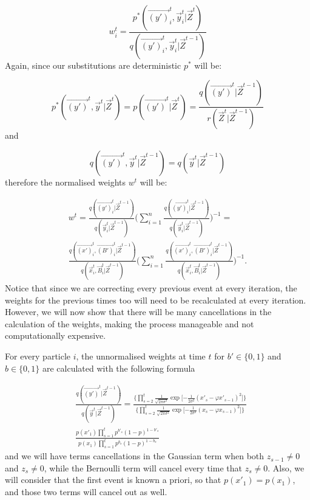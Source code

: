 \begin{equation*}
    w^{t}_i = \frac{p^*(\vec{(y')}^{t}_i, \vec{y}^{t}_i | \vec{Z}^{t})} {q(\vec{(y')}^{t}_i, \vec{y}^{t}_i|\vec{Z}^{t-1})}
\end{equation*}
Again, since our substitutions are deterministic $p^*$ will be:

\begin{equation*}
    p^*(\vec{(y')}^{t}, \vec{y}^{t} | \vec{Z}^{t}) = p(\vec{(y')}^{t} | \vec{Z}^{t}) = \frac{ q(\vec{(y')}^{t}|\vec{Z}^{t-1})} {r(\vec{Z}^{t} | \vec{Z}^{t-1})}
\end{equation*}
and

\begin{equation*}
    q(\vec{(y')}^{t}, \vec{y}^{t} | \vec{Z}^{t-1}) = q(\vec{y}^{t} | \vec{Z}^{t-1})
\end{equation*}
therefore the normalised weights $w^t$ will be:

\begin{multline*}
    w^{t} = \frac{q(\vec{(y')}^{t}_i | \vec{Z}^{t-1}) }{q(\vec{y}^{t}_i | \vec{Z}^{t-1})}\Bigg( \sum_{i=1}^n  \frac{q(\vec{(y')}^{t}_i | \vec{Z}^{t-1}) }{q(\vec{y}^{t}_i | \vec{Z}^{t-1})}\Bigg)^{-1} = \\
    \frac{q(\vec{(x')}^{t}_i, \vec{(B')}^{t}_i | \vec{Z}^{t-1}) }{q(\vec{x}^{t}_i, \vec{B}^{t}_i | \vec{Z}^{t-1})}\Bigg( \sum_{i=1}^n \frac{q(\vec{(x')}^{t}_i, \vec{(B')}^{t}_i | \vec{Z}^{t-1}) }{q(\vec{x}^{t}_i, \vec{B}^{t}_i | \vec{Z}^{t-1})}\Bigg)^{-1}.
\end{multline*}
Notice that since we are correcting every previous event at every iteration, the weights for the previous times too will need to be recalculated at every iteration. However, we will now show that there will be many cancellations in the calculation of the weights, making the process manageable and not computationally expensive.

For every particle $i$, the unnormalised weights at time $t$ for $b' \in \{0,1\}$ and $b \in \{0,1\}$ are calculated with the following formula

\begin{align} \label{eq:2}
    &\frac{q(\vec{(y')}^{t} | \vec{Z}^{t-1}) }{q(\vec{y}^{t} | \vec{Z}^{t-1})} =
    \frac{\bigg \{ \prod_{s=2}^{t}  \frac{1}{\sqrt{2 \pi \sigma^{2}}} \exp \bigg [ { - \frac{1}{2 \sigma^{2}} }  (x'_s - \varphi x'_{s-1})^{2} \bigg ] \bigg \} }{\bigg \{ \prod_{s=2}^{t}  \frac{1}{\sqrt{2 \pi \sigma^{2}}} \exp \bigg [ { - \frac{1}{2 \sigma^{2}} }  (x_s - \varphi x_{s-1})^{2} \bigg ] \bigg \} } \nonumber \\
    &\frac{p(x'_{1}) \prod_{s=1}^{t} p^{b'_s} (1 - p)^{1-b'_s}  }{ p(x_{1}) \prod_{s=1}^{t} p^{b_s} (1 - p)^{1-b_s} }
\end{align}
and we will have terms cancellations in the Gaussian term when both $z_{s-1} \neq 0$ and $z_s \neq 0$, while the Bernoulli term will cancel every time that $z_s \neq 0$. Also, we will consider that the first event is known a priori, so that $p(x'_1)=p(x_1)$, and those two terms will cancel out as well.

